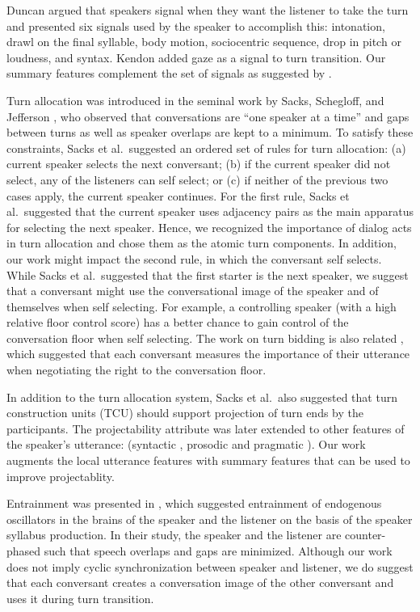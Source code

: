 Duncan \cite{duncan1972some} argued that speakers signal when they want the listener to take the turn and presented six signals used by the speaker to accomplish this: intonation, drawl on the final syllable, body motion, sociocentric sequence, drop in pitch or loudness, and syntax. Kendon \cite{kendon1967some} added gaze as a signal to turn transition. Our summary features complement the set of signals as suggested by \cite{duncan1972some}.


Turn allocation was introduced in the seminal work by Sacks, Schegloff, and Jefferson \cite{sacks1974simplest}, who observed that conversations are ``one speaker at a time'' and gaps between turns as well as speaker overlaps are kept to a minimum. To satisfy these constraints, Sacks et al.~suggested an ordered set of rules for turn allocation:
%
(a) current speaker selects the next conversant; (b) if the current speaker did not select, any of the listeners can self select; or (c) if neither of the previous two cases apply, the current speaker continues.
%
For the first rule, Sacks et al.~suggested that the current speaker uses adjacency pairs as the main apparatus for selecting the next speaker. Hence, we recognized the importance of dialog acts in turn allocation and chose them as the atomic turn components. In addition, our work might impact the second rule, in which the conversant self selects. While Sacks et al.~suggested that the first starter is the next speaker, we suggest that a conversant might use the conversational image of the speaker and of themselves when self selecting. For example, a controlling speaker (with a high relative floor control score) has a better chance to gain control of the conversation floor when self selecting.  The work on turn bidding is also related \cite{SelfridgeHeeman10:acl}, which suggested that each conversant measures the importance of their utterance when negotiating the right to the conversation floor.

In addition to the turn allocation system, Sacks et al.~also suggested that turn construction units (TCU) should support projection of turn ends by the participants. The projectability attribute was later extended to other features of the speaker's utterance: (syntactic \cite{sacks1974simplest}, prosodic \cite{ford1996interactional} and pragmatic \cite{ford1996interactional,ford2001intersection}). Our work augments the local utterance features with summary features that can be used to improve projectablity.

Entrainment was presented in \cite{wilson2005oscillator}, which suggested entrainment of endogenous oscillators in the brains of the speaker and the listener on the basis of the speaker syllabus production. In their study, the speaker and the listener are counter-phased such that speech overlaps and gaps are minimized. Although our work does not imply cyclic synchronization between speaker and listener, we do suggest that each conversant creates a conversation image of the other conversant and uses it during turn transition.


